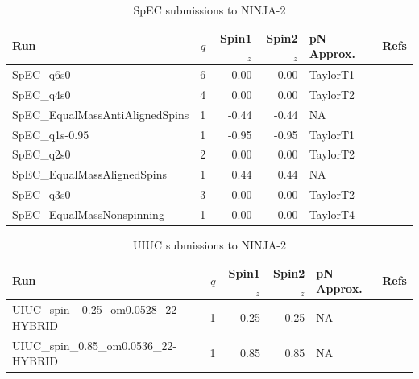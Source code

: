 \begin{table}
\begin{center}
\begin{tabular}{|l|r|r|r|l|c|}
\hline
Run & $q$ & Spin1${}_z$ & Spin2${}_z$ & pN Approx. & Refs \\
\hline
SpEC\_q6s0 & 6 & 0.00 & 0.00 & TaylorT1 & \cite{SpECWebsite} \\
SpEC\_q4s0 & 4 & 0.00 & 0.00 & TaylorT2 & \cite{SpECWebsite} \\
SpEC\_EqualMassAntiAlignedSpins & 1 & -0.44 & -0.44 & NA & \cite{chu-2009,SpECWebsite} \\
SpEC\_q1s-0.95 & 1 & -0.95 & -0.95 & TaylorT1 & \cite{SpECWebsite} \\
SpEC\_q2s0 & 2 & 0.00 & 0.00 & TaylorT2 & \cite{SpECWebsite} \\
SpEC\_EqualMassAlignedSpins & 1 & 0.44 & 0.44 & NA & \cite{chu-2009,SpECWebsite} \\
SpEC\_q3s0 & 3 & 0.00 & 0.00 & TaylorT2 & \cite{SpECWebsite} \\
SpEC\_EqualMassNonspinning & 1 & 0.00 & 0.00 & TaylorT4 & \cite{Scheel:2008rj,SpECWebsite} \\
\hline
\end{tabular}
\end{center}
\caption[SpEC submissions to NINJA-2]{
\label{tab:ninja2_spec}
SpEC submissions to NINJA-2}
\end{table}

\begin{table}
\begin{center}
\begin{tabular}{|l|r|r|r|l|c|}
\hline
Run & $q$ & Spin1${}_z$ & Spin2${}_z$ & pN Approx. & Refs \\
\hline
UIUC\_spin\_-0.25\_om0.0528\_22-HYBRID & 1 & -0.25 & -0.25 & NA & \cite{none} \\
UIUC\_spin\_0.85\_om0.0536\_22-HYBRID & 1 & 0.85 & 0.85 & NA & \cite{none} \\
\hline
\end{tabular}
\end{center}
\caption[UIUC submissions to NINJA-2]{
\label{tab:ninja2_uiuc}
UIUC submissions to NINJA-2}
\end{table}


